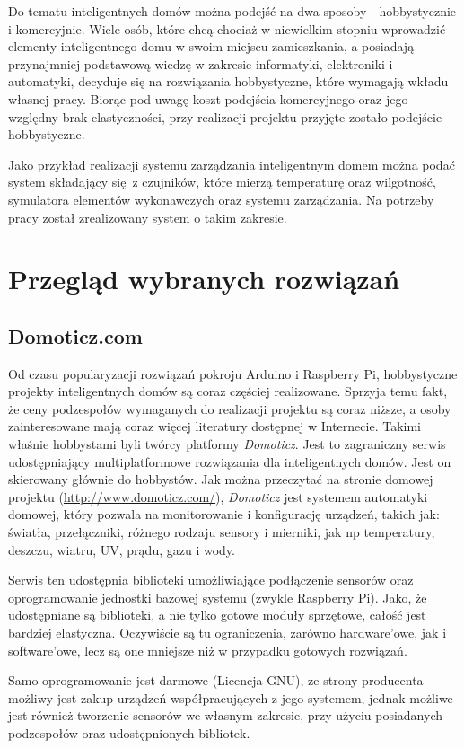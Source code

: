 \documentclass[eng,oneside]{mgr}
\begin{document}
Do tematu inteligentnych domów można podejść na dwa sposoby - hobbystycznie i komercyjnie. Wiele osób, które chcą chociaż w niewielkim stopniu wprowadzić elementy inteligentnego domu w swoim miejscu zamieszkania, a posiadają przynajmniej podstawową wiedzę w zakresie informatyki, elektroniki i automatyki, decyduje się na rozwiązania hobbystyczne, które wymagają wkładu własnej pracy. Biorąc pod uwagę koszt podejścia komercyjnego oraz jego względny brak elastyczności, przy realizacji projektu przyjęte zostało podejście hobbystyczne.

Jako przykład realizacji systemu zarządzania inteligentnym domem można podać system składający się z czujników, które mierzą temperaturę oraz wilgotność, symulatora elementów wykonawczych oraz systemu zarządzania. Na potrzeby pracy został zrealizowany system o takim zakresie.

\section{Przegląd wybranych rozwiązań}
\subsection{Domoticz.com}
Od czasu popularyzacji rozwiązań pokroju Arduino i Raspberry Pi, hobbystyczne projekty inteligentnych domów są coraz częściej realizowane. Sprzyja temu fakt, że ceny podzespołów wymaganych do realizacji projektu są coraz niższe, a osoby zainteresowane mają coraz więcej literatury dostępnej w Internecie. Takimi właśnie hobbystami byli twórcy platformy \textit{Domoticz}. Jest to zagraniczny serwis udostępniający multiplatformowe rozwiązania dla inteligentnych domów. Jest on skierowany głównie do hobbystów. Jak można przeczytać na stronie domowej projektu (\url{http://www.domoticz.com/}), \textit{Domoticz} jest systemem automatyki domowej, który pozwala na monitorowanie i konfigurację urządzeń, takich jak: światła, przełączniki, różnego rodzaju sensory i mierniki, jak np temperatury, deszczu, wiatru, UV, prądu, gazu i wody.

Serwis ten udostępnia biblioteki umożliwiające podłączenie sensorów oraz oprogramowanie jednostki bazowej systemu (zwykle Raspberry Pi). Jako, że udostępniane są biblioteki, a nie tylko gotowe moduły sprzętowe, całość jest bardziej elastyczna. Oczywiście są tu ograniczenia, zarówno hardware'owe, jak i software'owe, lecz są one mniejsze niż w przypadku gotowych rozwiązań.

Samo oprogramowanie jest darmowe (Licencja GNU), ze strony producenta możliwy jest zakup urządzeń współpracujących z jego systemem, jednak możliwe jest również tworzenie sensorów we własnym zakresie, przy użyciu posiadanych podzespołów oraz udostępnionych bibliotek.
\end{document}
